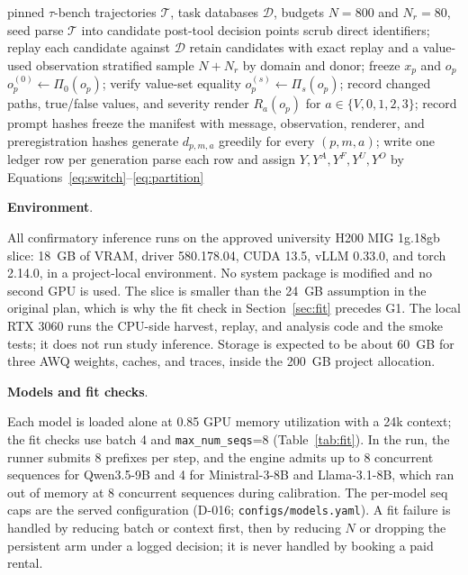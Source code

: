 \documentclass[a4paper,fleqn]{cas-sc}
\begin{document}
\begin{algorithm}[htbp]
  \caption{Frozen fixed-prefix matrix and labels (G0--G2).}
  \label{alg:matrix}
  \begin{algorithmic}[1]
    \Require pinned $\tau$-bench trajectories $\mathcal{T}$, task databases $\mathcal{D}$,
    budgets $N=800$ and $N_{r}=80$, seed
    \State parse $\mathcal{T}$ into candidate post-tool decision points
    \State scrub direct identifiers; replay each candidate against $\mathcal{D}$
    \State retain candidates with exact replay and a value-used observation
    \State stratified sample $N+N_{r}$ by domain and donor; freeze $x_p$ and $o_p$
      \State $o_p^{(0)}\gets\Pi_0(o_p)$; verify value-set equality
        \State $o_p^{(s)}\gets\Pi_s(o_p)$; record changed paths, true/false values, and severity
      \EndFor
      \State render $R_a(o_p)$ for $a\in\{V,0,1,2,3\}$; record prompt hashes
    \EndFor
    \State freeze the manifest with message, observation, renderer, and preregistration hashes
    \State generate $d_{p,m,a}$ greedily for every $(p,m,a)$; write one ledger row per generation
    \State parse each row and assign $Y,Y^{A},Y^{F},Y^{U},Y^{O}$ by
    Equations~\ref{eq:switch}--\ref{eq:partition}
  \end{algorithmic}
\end{algorithm}



\noindent\textbf{Environment}.\

All confirmatory inference runs on the approved university H200 MIG 1g.18gb slice: 18~GB of
VRAM, driver 580.178.04, CUDA 13.5, vLLM 0.33.0, and torch 2.14.0, in a project-local
environment. No system package is modified and no second GPU is used. The slice is smaller than
the 24~GB assumption in the original plan, which is why the fit check in
Section~\ref{sec:fit} precedes G1. The local RTX 3060 runs the CPU-side harvest, replay, and
analysis code and the smoke tests; it does not run study inference. Storage is expected to be
about 60~GB for three AWQ weights, caches, and traces, inside the 200~GB project allocation.

\noindent\textbf{Models and fit checks}.\ \label{sec:fit}

Each model is loaded alone at 0.85 GPU memory utilization with a 24k context; the fit checks use
batch 4 and \texttt{max\_num\_seqs}=8 (Table~\ref{tab:fit}). In the run, the runner submits 8
prefixes per step, and the engine admits up to 8 concurrent sequences for Qwen3.5-9B and 4 for
Ministral-3-8B and Llama-3.1-8B, which ran out of memory at 8 concurrent sequences during
calibration. The per-model seq caps are the served configuration (D-016;
\texttt{configs/models.yaml}). A fit failure is handled by reducing batch or context first, then
by reducing $N$ or dropping the persistent arm under a logged decision; it is never handled by
booking a paid rental.
\end{document}
